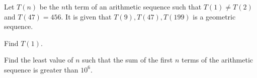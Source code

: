
Let $T(n)$ be the $n$th term of an arithmetic sequence such that $T(1) \neq T(2)$ and $T(47)=456$. It is given that $T(9), T(47), T(199)$ is a geometric sequence.
\begin{enumx}[label=(\alph*)]
    \item Find $T(1)$.
    \item Find the least value of $n$ such that the sum of the first $n$ terms of the arithmetic sequence is greater than $10^6$.
\end{enumx}





